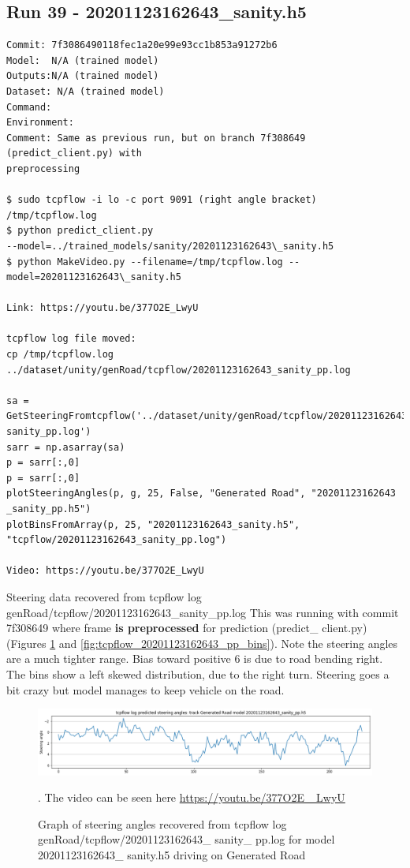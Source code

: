 \subsection{Run 39 - 20201123162643\_sanity.h5}
\label{app_res:39}
\begin{verbatim}
Commit: 7f3086490118fec1a20e99e93cc1b853a91272b6
Model:  N/A (trained model)
Outputs:N/A (trained model)
Dataset: N/A (trained model)
Command: 
Environment: 
Comment: Same as previous run, but on branch 7f308649 (predict_client.py) with
preprocessing

$ sudo tcpflow -i lo -c port 9091 (right angle bracket) /tmp/tcpflow.log
$ python predict_client.py
--model=../trained_models/sanity/20201123162643\_sanity.h5
$ python MakeVideo.py --filename=/tmp/tcpflow.log --model=20201123162643\_sanity.h5

Link: https://youtu.be/377O2E_LwyU

tcpflow log file moved:
cp /tmp/tcpflow.log ../dataset/unity/genRoad/tcpflow/20201123162643_sanity_pp.log

sa = GetSteeringFromtcpflow('../dataset/unity/genRoad/tcpflow/20201123162643_
sanity_pp.log')
sarr = np.asarray(sa)
p = sarr[:,0]
p = sarr[:,0]  
plotSteeringAngles(p, g, 25, False, "Generated Road", "20201123162643
_sanity_pp.h5")
plotBinsFromArray(p, 25, "20201123162643_sanity.h5",
"tcpflow/20201123162643_sanity_pp.log")

Video: https://youtu.be/377O2E_LwyU
\end{verbatim}

Steering data recovered from tcpflow log genRoad/tcpflow/20201123162643\_sanity\_pp.log
This was running with commit 7f308649 where frame \textbf{is preprocessed} for prediction (predict\_ client.py) (Figures  \ref{fig:tcpflow_20201123162643_pp_graph} and  \ref{fig:tcpflow_20201123162643_pp_bins}). 
Note the steering angles are a much tighter range. Bias toward positive 6 is due to road bending right.
The bins show a left skewed distribution, due to the right turn. Steering goes a bit crazy but model
manages to keep vehicle on the road.

\begin{figure}[ht]
 \centering 
 \includegraphics[width=\textwidth]{Figures/tcpflow_20201123162643_sanity_pp_graph.png}
 \caption{Graph of steering angles recovered from tcpflow log genRoad/tcpflow/20201123162643\_ sanity\_  pp.log for model 20201123162643\_ sanity.h5 driving on Generated Road}. The video can be seen here \url{https://youtu.be/377O2E\_ LwyU}
 \label{fig:tcpflow_20201123162643_pp_graph}
\end{figure}

